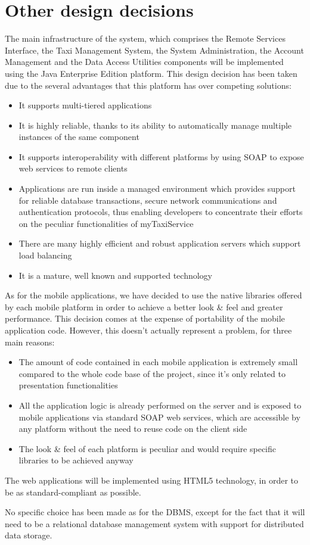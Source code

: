\section{Other design decisions}
The main infrastructure of the system, which comprises the Remote Services Interface, the Taxi Management System, the System Administration, the Account Management and the Data Access Utilities components will be implemented using the Java Enterprise Edition platform. This design decision has been taken due to the several advantages that this platform has over competing solutions:
\begin{itemize}
	\item It supports multi-tiered applications
	\item It is highly reliable, thanks to its ability to automatically manage multiple instances of the same component
	\item It supports interoperability with different platforms by using SOAP to expose web services to remote clients 
	\item Applications are run inside a managed environment which provides support for reliable database transactions, secure network communications and authentication protocols, thus enabling developers to concentrate their efforts on the peculiar functionalities of myTaxiService
	\item There are many highly efficient and robust application servers which support load balancing
	\item It is a mature, well known and supported technology
\end{itemize}

As for the mobile applications, we have decided to use the native libraries offered by each mobile platform in order to achieve a better look \& feel and greater performance. This decision comes at the expense of portability of the mobile application code. However, this doesn't actually represent a problem, for three main reasons:
\begin{itemize}
	\item The amount of code contained in each mobile application is extremely small compared to the whole code base of the project, since it's only related to presentation functionalities
	\item All the application logic is already performed on the server and is exposed to mobile applications via standard SOAP web services, which are accessible by any platform without the need to reuse code on the client side
	\item The look \& feel of each platform is peculiar and would require specific libraries to be achieved anyway 
\end{itemize}

The web applications will be implemented using HTML5 technology, in order to be as standard-compliant as possible.

No specific choice has been made as for the DBMS, except for the fact that it will need to be a relational database management system with support for distributed data storage.